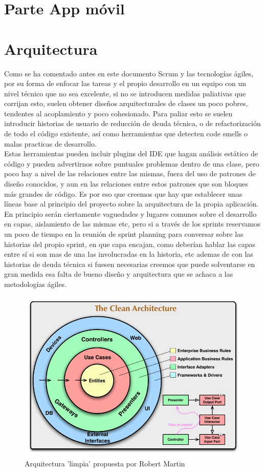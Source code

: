 \documentclass[../pfc.tex]{subfiles}
\begin{document}
	
	\section{Parte App móvil}
	
	\section{Arquitectura}
	
	Como se ha comentado antes en este documento Scrum y las tecnologías ágiles, por su forma de enfocar las tareas y el propio desarrollo en un equipo con un nivel técnico que no sea excelente, si no se introducen medidas paliativas que corrijan esto, suelen obtener diseños arquitecturales de clases un poco pobres, tendentes al acoplamiento y poco cohesionado. Para paliar esto se suelen introducir historias de usuario de reducción de deuda técnica, o de refactorización de todo el código existente, así como herramientas que detecten code smells\cite{refactoring} o malas practicas de desarrollo.\\ 
	
	Estas herramientas pueden incluir plugins del IDE que hagan análisis estático de código y pueden advertirnos sobre puntuales problemas dentro de una clase, pero poco hay a nivel de las relaciones entre las mismas, fuera del uso de patrones de diseño conocidos, y aun en las relaciones entre estos patrones que son bloques más grandes de código. Es por eso que creemos que hay que establecer unas líneas base al principio del proyecto sobre la arquitectura de la propia aplicación. En principio serán ciertamente vaguedades y lugares comunes sobre el desarrollo en capas, aislamiento de las mismas etc, pero si a través de los sprints reservamos un poco de tiempo en la reunión de sprint planning para conversar sobre las historias del propio sprint, en que capa encajan, como deberían hablar las capas entre sí si son mas de una las involucradas en la historia, etc ademas de con las historias de deuda técnica si fuesen necesarias creemos que puede solventarse en gran medida esa falta de bueno diseño y arquitectura que se achaca a las metodologías ágiles.\\
	
	
		\begin{figure}[H]
			\centering
			\includegraphics[width=0.8\linewidth]{../images/CleanArchitecture}
			\caption{Arquitectura 'limpia' propuesta por Robert Martin}
			\label{fig:cleanarch}
		\end{figure}
	
\end{document}
